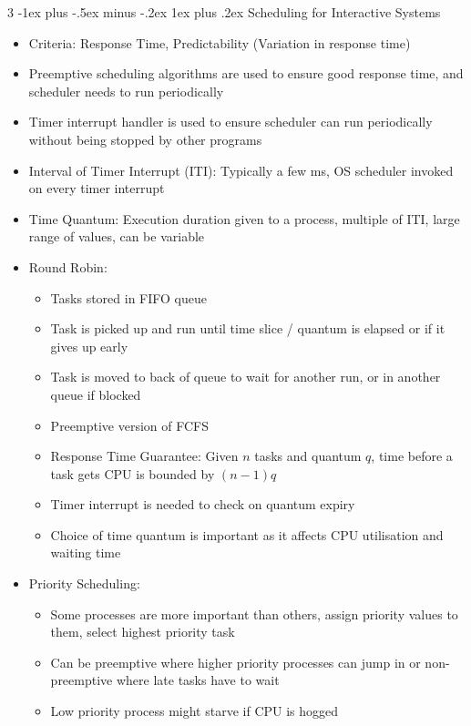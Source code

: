 \documentclass[10pt, landscape]{article}
\makeatletter
\renewcommand{\subsection}{\@startsection{subsection}{3}{0mm}%
                                {-1ex plus -.5ex minus -.2ex}%
                                {1ex plus .2ex}%
                                {\normalfont\small\bfseries}}%
\makeatother
\begin{document}
\begin{multicols*}{3}
\subsection{Scheduling for Interactive Systems}
\begin{itemize}
    \item Criteria: Response Time, Predictability (Variation in response time)
    \item Preemptive scheduling algorithms are used to ensure good response time, and scheduler needs to run periodically
    \item Timer interrupt handler is used to ensure scheduler can run periodically without being stopped by other programs
    \item Interval of Timer Interrupt (ITI): Typically a few ms, OS scheduler invoked on every timer interrupt
    \item Time Quantum: Execution duration given to a process, multiple of ITI, large range of values, can be variable
    \item Round Robin:
    \begin{itemize}
        \item Tasks stored in FIFO queue
        \item Task is picked up and run until time slice / quantum is elapsed or if it gives up early
        \item Task is moved to back of queue to wait for another run, or in another queue if blocked
        \item Preemptive version of FCFS
        \item Response Time Guarantee: Given $n$ tasks and quantum $q$, time before a task gets CPU is bounded by $(n-1)q$
        \item Timer interrupt is needed to check on quantum expiry
        \item Choice of time quantum is important as it affects CPU utilisation and waiting time
    \end{itemize}
    \item Priority Scheduling:
    \begin{itemize}
        \item Some processes are more important than others, assign priority values to them, select highest priority task
        \item Can be preemptive where higher priority processes can jump in or non-preemptive where late tasks have to wait
        \item Low priority process might starve if CPU is hogged

\end{itemize}
\end{itemize}
\end{multicols*}
\end{document}

